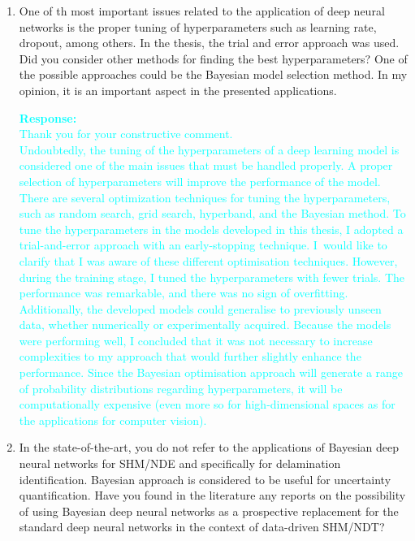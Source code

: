 \documentclass[11pt,a2paper]{report}
\begin{document}
{\begin{enumerate}
		\item One of th most important issues related to the application of deep neural networks is the proper tuning of hyperparameters such as learning rate, dropout, among others. 
		In the thesis, the trial and error approach was used. 
		Did you consider other methods for finding the best hyperparameters? One of the possible approaches could be the Bayesian model selection method. 
		In my opinion, it is an important aspect in the presented applications.
		
		\textcolor{Cyan}{
			\textbf{Response:}\\
			Thank you for your constructive comment. \\
			Undoubtedly, the tuning of the hyperparameters of a deep learning model is considered one of the main issues that must be handled properly.
			A proper selection of hyperparameters will improve the performance of the model. 
			There are several optimization techniques for tuning the hyperparameters, such as random search, grid search, hyperband, and the Bayesian method.
			To tune the hyperparameters in the models developed in this thesis, I adopted a trial-and-error approach with an early-stopping technique.
			I would like to clarify that I was aware of these different optimisation techniques.
			However, during the training stage, I tuned the hyperparameters with fewer trials. 
			The performance was remarkable, and there was no sign of overfitting. 
			Additionally, the developed models could generalise to previously unseen data, whether numerically or experimentally acquired.
			Because the models were performing well, I concluded that it was not necessary to increase complexities to my approach that would further slightly enhance the performance.
			Since the Bayesian optimisation approach will generate a range of probability distributions regarding hyperparameters, it will be computationally expensive (even more so for high-dimensional spaces as for the applications for computer vision). 
		}	
		
		\item In the state-of-the-art, you do not refer to the applications of Bayesian deep neural networks for SHM/NDE and specifically for delamination identification. 
		Bayesian approach is considered to be useful for uncertainty quantification. 
		Have you found in the literature any reports on the possibility of using Bayesian deep neural networks as a prospective replacement for the standard deep neural networks in the context of data-driven SHM/NDT?	
			

\end{enumerate}}
\end{document}
